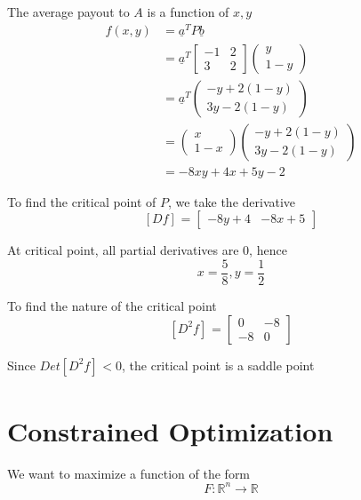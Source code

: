 The average payout to $A$ is a function of $x, y$ 
\begin{align*}
   f(x, y) &= \underline{a}^T P \underline{b} \\
           &= \underline{a}^T \begin{bmatrix} 
              -1 & 2 \\ 3 & 2  
           \end{bmatrix} \begin{pmatrix} y \\ 1-y \end{pmatrix} 
            \\
           &=  \underline{a}^T \begin{pmatrix} -y + 2(1-y) \\ 3y - 2(1-y) \end{pmatrix}  \\
           &=  \begin{pmatrix} x \\ 1-x \end{pmatrix} \begin{pmatrix} -y + 2(1-y) \\ 3y - 2(1-y) \end{pmatrix}  \\ 
           &= -8xy + 4x + 5y -2
\end{align*}

To find the critical point of $P$, we take the derivative
\[
  \left[ D f \right]_{} = \begin{bmatrix} 
     -8y + 4 & -8x + 5  
  \end{bmatrix}
\] 

At critical point, all partial derivatives are $0$, hence
\[
  x = \frac{5}{8}, y = \frac{1}{2}
\] 

To find the nature of the critical point
\[
   \left[ D^2 f \right]_{} = \begin{bmatrix} 
      0 & -8 \\ -8 & 0
   \end{bmatrix}
\] 

Since $Det \left[ D^2 f \right]_{} < 0$, the critical point is a saddle point

\section{Constrained Optimization}

We want to maximize a function of the form
\[
  F: \mathbb{R}^n \rightarrow \mathbb{R}
\] 

